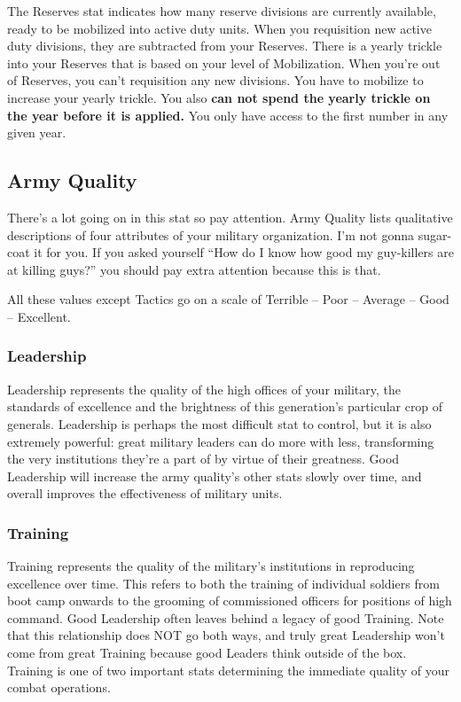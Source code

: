 \documentclass[11 pt]{scrartcl}
\begin{document}
The Reserves stat indicates how many reserve divisions are currently available, ready to be mobilized into active duty units. When you requisition new active duty divisions, they are subtracted from your Reserves. There is a yearly trickle into your Reserves that is based on your level of Mobilization. When you're out of Reserves, you can't requisition any new divisions. You have to mobilize to increase your yearly trickle. You also \textbf{can not spend the yearly trickle on the year before it is applied.} You only have access to the first number in any given year.

\subsection{Army Quality}

There's a lot going on in this stat so pay attention. Army Quality lists qualitative descriptions of four attributes of your military organization. I'm not gonna sugar-coat it for you. If you asked yourself ``How do I know how good my guy-killers are at killing guys?'' you should pay extra attention because this is that.

All these values except Tactics go on a scale of Terrible -- Poor -- Average -- Good -- Excellent.

\subsubsection*{Leadership}

Leadership represents the quality of the high offices of your military, the standards of excellence and the brightness of this generation's particular crop of generals. Leadership is perhaps the most difficult stat to control, but it is also extremely powerful: great military leaders can do more with less, transforming the very institutions they're a part of by virtue of their greatness. Good Leadership will increase the army quality's other stats slowly over time, and overall improves the effectiveness of military units.

\subsubsection*{Training}

Training represents the quality of the military's institutions in reproducing excellence over time. This refers to both the training of individual soldiers from boot camp onwards to the grooming of commissioned officers for positions of high command. Good Leadership often leaves behind a legacy of good Training. Note that this relationship does NOT go both ways, and truly great Leadership won't come from great Training because good Leaders think outside of the box. Training is one of two important stats determining the immediate quality of your combat operations.
\end{document}
